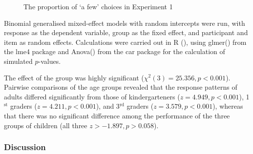 \documentclass[output=paper]{langscibook}
\begin{document}
\begin{figure}
    \centering
    \caption{The proportion of `a few' choices in Experiment 1}
    \label{kis-zet:exp1 results}
\end{figure}


Binomial generalised mixed-effect models with random intercepts were run, with response as the dependent variable, group as the fixed effect, and participant and item as random effects. Calculations were carried out in R (\citealt{rcore19}), using glmer() from the lme4 package \citep{bates2015fitting} and Anova() from the car package \citep{fox2018r} for the calculation of simulated $p$-values.

The effect of the group was highly significant ($\chi^{2}(3) = 25.356, p < 0.001$). Pairwise comparisons of the age groups revealed that the response patterns of adults differed significantly from those of kindergarteners ($z = 4.949, p < 0.001$), 1$^\text{st}$ graders ($z = 4.211, p < 0.001$), and 3$^\text{rd}$ graders ($z = 3.579, p < 0.001$), whereas that there was no significant difference among the performance of the three groups of children (all three $z > -1.897, p > 0.058$).    

\subsubsection{Discussion} 
\end{document}
